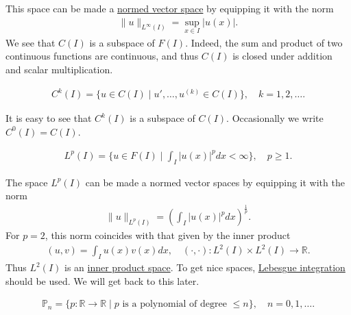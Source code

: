 \documentclass[12pt,oneside]{amsart}
\def\R{\mathbb R}
\begin{document}
This space can be made a \href{https://en.wikipedia.org/wiki/Normed_vector_space}{normed vector space} by equipping it with the norm 
    \begin{align*}
\|u\|_{L^\infty(I)} = \sup_{x \in I} |u(x)|.
    \end{align*}
We see that $C(I)$ is a subspace of $F(I)$. Indeed, the sum and product of two continuous functions are continuous, and thus $C(I)$ is closed under addition and scalar multiplication. 

\begin{definition}
    \begin{align*}
C^k(I) = \{ u \in C(I) \mid u', \dots, u^{(k)} \in C(I)\}, \quad k = 1,2,\dots.
    \end{align*}
\end{definition}

It is easy to see that $C^k(I)$ is a subspace of $C(I)$. Occasionally we write $C^0(I) = C(I)$.

\begin{definition}
    \begin{align*}
L^p(I) = \{u \in F(I) \mid \int_I |u(x)|^p dx < \infty \}, 
\quad p \ge 1.
    \end{align*}
\end{definition}

The space $L^p(I)$ can be made a normed vector spaces by equipping it with the norm 
    \begin{align*}
\|u\|_{L^p(I)} = \left( \int_I |u(x)|^p dx \right)^{\frac1p}.
    \end{align*}
For $p=2$, this norm coincides with that given by the inner product
    \begin{align*}
(u, v) = \int_I u(x) v(x) dx, \quad (\cdot, \cdot) : L^2(I) \times L^2(I) \to \mathbb R.
    \end{align*}
Thus $L^2(I)$ is an \href{https://en.wikipedia.org/wiki/Inner_product_space}{inner product space}.
To get nice spaces, \href{https://en.wikipedia.org/wiki/Lebesgue_integration}{Lebesgue integration} should be used. We will get back to this later.

\begin{definition}
    \begin{align*}
\mathbb P_n = \{p : \R \to \R \mid \text{$p$ is a polynomial of degree $\le n$}\}, \quad n = 0, 1, \dots.
    \end{align*}
\end{definition}
\end{document}
